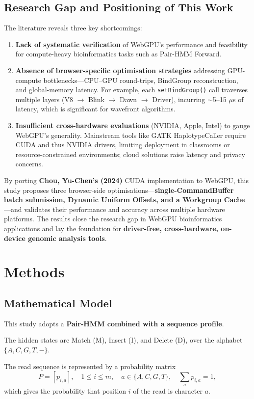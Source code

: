 \documentclass[12pt]{report}
\begin{document}
\section{Research Gap and Positioning of This Work}
The literature reveals three key shortcomings:
\begin{enumerate}
    \item \textbf{Lack of systematic verification} of WebGPU’s performance and feasibility for compute-heavy bioinformatics tasks such as Pair-HMM Forward.
    \item \textbf{Absence of browser-specific optimisation strategies} addressing GPU-compute bottlenecks—CPU–GPU round-trips, BindGroup reconstruction, and global-memory latency. For example, each \texttt{setBindGroup()} call traverses multiple layers (V8 $\rightarrow$ Blink $\rightarrow$ Dawn $\rightarrow$ Driver), incurring $\sim$5–15 $\mu$s of latency, which is significant for wavefront algorithms.
    \item \textbf{Insufficient cross-hardware evaluations} (NVIDIA, Apple, Intel) to gauge WebGPU’s generality. Mainstream tools like GATK HaplotypeCaller require CUDA and thus NVIDIA drivers, limiting deployment in classrooms or resource-constrained environments; cloud solutions raise latency and privacy concerns.
\end{enumerate}
By porting \textbf{Chou, Yu-Chen’s (2024)} CUDA implementation to WebGPU, this study proposes three browser-side optimisations—\textbf{single-CommandBuffer batch submission, Dynamic Uniform Offsets, and a Workgroup Cache}—and validates their performance and accuracy across multiple hardware platforms. The results close the research gap in WebGPU bioinformatics applications and lay the foundation for \textbf{driver-free, cross-hardware, on-device genomic analysis tools}.

\chapter{Methods}
\section{Mathematical Model}
This study adopts a \textbf{Pair-HMM combined with a sequence profile}.

The hidden states are Match (M), Insert (I), and Delete (D), over the alphabet $\{A,C,G,T,-\}$.

The read sequence is represented by a probability matrix
\[
P = [p_{i,a}], \quad 1 \leq i \leq m, \quad a \in \{A,C,G,T\}, \quad \sum_a p_{i,a} = 1,
\]
which gives the probability that position $i$ of the read is character $a$.
\end{document}
